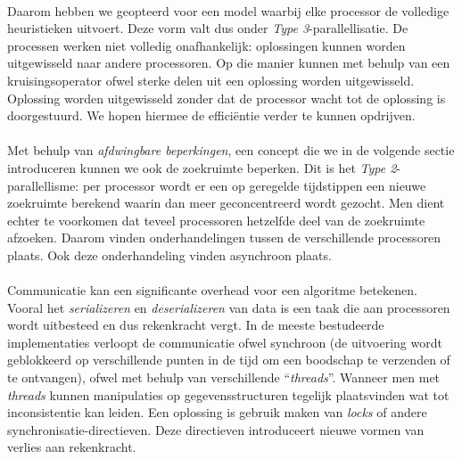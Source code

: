 \paragraph{}
Daarom hebben we geopteerd voor een model waarbij elke processor de volledige heuristieken uitvoert. Deze vorm valt dus onder \emph{Type 3}-parallellisatie. De processen werken niet volledig onafhankelijk: oplossingen kunnen worden uitgewisseld naar andere processoren. Op die manier kunnen met behulp van een kruisingsoperator ofwel \emph{\abco{}} sterke delen uit een oplossing worden uitgewisseld. Oplossing worden uitgewisseld zonder dat de processor wacht tot de oplossing is doorgestuurd. We hopen hiermee de effici\"entie verder te kunnen opdrijven.

\paragraph{}
Met behulp van \emph{afdwingbare beperkingen}, een concept die we in de volgende sectie introduceren kunnen we ook de zoekruimte beperken. Dit is het \emph{Type 2}-parallellisme: per processor wordt er een op geregelde tijdstippen een nieuwe zoekruimte berekend waarin dan meer geconcentreerd wordt gezocht. Men dient echter te voorkomen dat teveel processoren hetzelfde deel van de zoekruimte afzoeken. Daarom vinden onderhandelingen tussen de verschillende processoren plaats. Ook deze onderhandeling vinden asynchroon plaats.

\paragraph{}
Communicatie kan een significante overhead voor een algoritme betekenen. Vooral het \emph{serializeren} en \emph{deserializeren} van data is een taak die aan processoren wordt uitbesteed en dus rekenkracht vergt. In de meeste bestudeerde implementaties verloopt de communicatie ofwel synchroon (de uitvoering wordt geblokkeerd op verschillende punten in de tijd om een boodschap te verzenden of te ontvangen), ofwel met behulp van verschillende ``\emph{threads}''. Wanneer men met \emph{threads} kunnen manipulaties op gegevensstructuren tegelijk plaatsvinden wat tot inconsistentie kan leiden. Een oplossing is gebruik maken van \emph{locks} of andere synchronisatie-directieven. Deze directieven introduceert nieuwe vormen van verlies aan rekenkracht.

